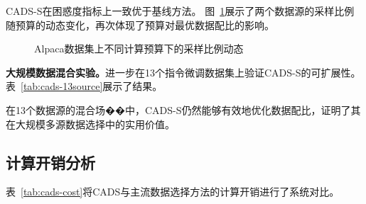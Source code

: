 CADS-S在困惑度指标上一致优于基线方法。%
图~\ref{fig:cads-alpaca-ratio}展示了两个数据源的采样比例随预算的动态变化，再次体现了预算对最优数据配比的影响。

\begin{figure}[htb]
  \centering
  \caption{Alpaca数据集上不同计算预算下的采样比例动态}
  \label{fig:cads-alpaca-ratio}
\end{figure}

\textbf{大规模数据混合实验。}进一步在13个指令微调数据集\cite{alpaca, peng2023instruction, lian2023slimorca, openorcagpt4, gpteacher, khashabi2020unifiedqa, liu2019multi, wei2021finetuned, bukharin2023data, raffel2019exploring}上验证CADS-S的可扩展性。表~\ref{tab:cads-13source}展示了结果。

\begin{table}[htb]
  \centering
  \caption{13个指令微调数据集的大规模数据混合实验结果}
  \label{tab:cads-13source}
\end{table}

在13个数据源的混合场��中，CADS-S仍然能够有效地优化数据配比，证明了其在大规模多源数据选择中的实用价值。%

\subsection{计算开销分析}

表~\ref{tab:cads-cost}将CADS与主流数据选择方法的计算开销进行了系统对比。

\begin{table}[htb]
  \centering
  \caption{各数据选择方法的计算开销对比分析}
  \label{tab:cads-cost}
\end{table}

